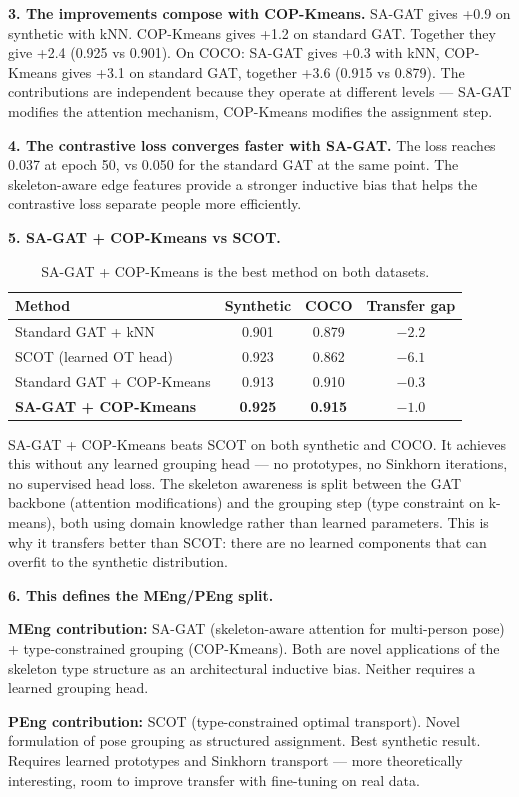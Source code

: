 \textbf{3. The improvements compose with COP-Kmeans.} SA-GAT gives +0.9 on synthetic with kNN. COP-Kmeans gives +1.2 on standard GAT. Together they give +2.4 (0.925 vs 0.901). On COCO: SA-GAT gives +0.3 with kNN, COP-Kmeans gives +3.1 on standard GAT, together +3.6 (0.915 vs 0.879). The contributions are independent because they operate at different levels --- SA-GAT modifies the attention mechanism, COP-Kmeans modifies the assignment step.

\textbf{4. The contrastive loss converges faster with SA-GAT.} The loss reaches 0.037 at epoch 50, vs 0.050 for the standard GAT at the same point. The skeleton-aware edge features provide a stronger inductive bias that helps the contrastive loss separate people more efficiently.

\textbf{5. SA-GAT + COP-Kmeans vs SCOT.}

\begin{table}[H]
\centering
\footnotesize
\begin{tabular}{lccc}
\toprule
Method & Synthetic & COCO & Transfer gap \\
\midrule
Standard GAT + kNN & 0.901 & 0.879 & $-2.2$ \\
SCOT (learned OT head) & 0.923 & 0.862 & $-6.1$ \\
Standard GAT + COP-Kmeans & 0.913 & 0.910 & $-0.3$ \\
\textbf{SA-GAT + COP-Kmeans} & \textbf{0.925} & \textbf{0.915} & $\mathbf{-1.0}$ \\
\bottomrule
\end{tabular}
\caption{SA-GAT + COP-Kmeans is the best method on both datasets.}
\end{table}

SA-GAT + COP-Kmeans beats SCOT on both synthetic and COCO. It achieves this without any learned grouping head --- no prototypes, no Sinkhorn iterations, no supervised head loss. The skeleton awareness is split between the GAT backbone (attention modifications) and the grouping step (type constraint on k-means), both using domain knowledge rather than learned parameters. This is why it transfers better than SCOT: there are no learned components that can overfit to the synthetic distribution.

\textbf{6. This defines the MEng/PEng split.}

\begin{compactitem}
  \item \textbf{MEng contribution:} SA-GAT (skeleton-aware attention for multi-person pose) + type-constrained grouping (COP-Kmeans). Both are novel applications of the skeleton type structure as an architectural inductive bias. Neither requires a learned grouping head.
  \item \textbf{PEng contribution:} SCOT (type-constrained optimal transport). Novel formulation of pose grouping as structured assignment. Best synthetic result. Requires learned prototypes and Sinkhorn transport --- more theoretically interesting, room to improve transfer with fine-tuning on real data.
\end{compactitem}


